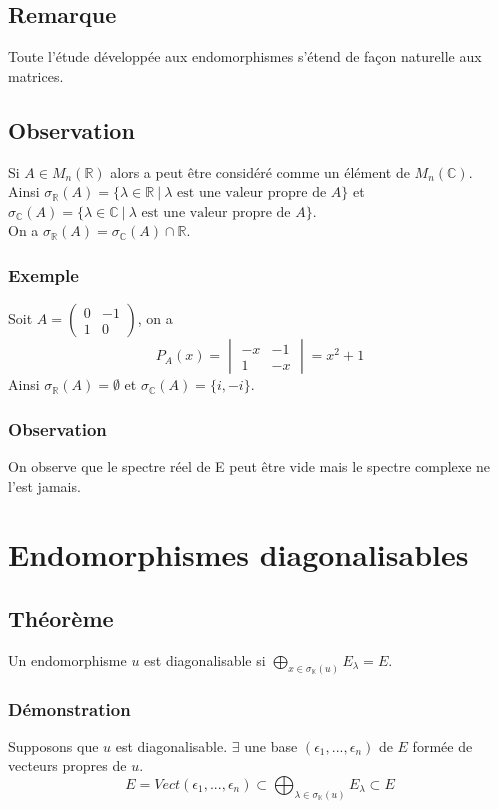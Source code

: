 \documentclass[a4paper,10pt]{book} %
\newcommand{\R}{\mathbb{R}}
\newcommand{\C}{\mathbb{C}}
\newcommand{\K}{\mathbb{K}}
\newcommand{\tq}{~|~}
\newcommand{\displayAmath}{\displaystyle}
\begin{document}
\subsection{Remarque}
Toute l'étude développée aux endomorphismes s'étend de façon naturelle aux matrices.

\subsection{Observation}
Si $A\in M_n(\R)$ alors a peut être considéré comme un élément de $M_n (\C)$.\\

Ainsi $\sigma_\R(A)=\{\lambda\in \R \tq \lambda\text{ est une valeur propre de } A \}$ et
$\sigma_\C(A)=\{\lambda\in \C \tq \lambda\text{ est une valeur propre de } A\}$.\\

On a $\sigma_\R(A)=\sigma_\C(A)\cap \R$.

\subsubsection{Exemple}
Soit $A=\begin{pmatrix}
0&-1\\
1&0
\end{pmatrix}$, on a
$$P_A(x)=\begin{vmatrix}
-x&-1\\
1&-x
\end{vmatrix}=x^2+1$$
Ainsi $\sigma_{\R}(A)=\emptyset$ et $\sigma_{\C}(A)=\{i,-i\}$.\\

\subsubsection{Observation}
On observe que le spectre réel de E peut être vide mais le spectre complexe ne l'est jamais. 

\newpage

\section{Endomorphismes diagonalisables}
\subsection{Théorème}
Un endomorphisme $u$ est diagonalisable si
$\displayAmath\bigoplus_{x\in \sigma_{\K}(u)}E_\lambda = E$.

\subsubsection{Démonstration}
Supposons que $u$ est diagonalisable. $\exists$ une base $(\epsilon_1,...,\epsilon_n)$ de $E$ formée de vecteurs propres de $u$.\\
$$E=Vect(\epsilon_1,...,\epsilon_n)\subset \bigoplus_{\lambda\in \sigma_{\K}(u)}E_\lambda \subset E$$\\
\end{document}
